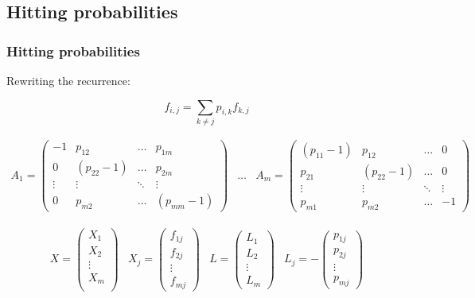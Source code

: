 \subsection{Hitting probabilities}
 \begin{frame}\frametitle{Hitting probabilities}
    \vspace{3em}
    
    Rewriting the recurrence:     
    
    \[
    f_{i,j} = \sum_{k\neq j} p_{i,k} f_{k,j}
    \]

    \fontsize{6pt}{0}\selectfont
    \begin{equation*}
    \begin{array}{rcl}
    A_1 = \left(\begin{matrix}
    -1     & p_{12}       & \ldots & p_{1m} \\
    0      & (p_{22} - 1) & \ldots & p_{2m} \\
    \vdots & \vdots       & \ddots & \vdots  \\
    0      & p_{m 2}      & \ldots & (p_{mm} - 1)
    \end{matrix}\right) & \ldots &
    A_m = \left(\begin{matrix}
    (p_{11} - 1) & p_{12}      & \ldots & 0 \\
    p_{21}       & (p_{22} -1) & \ldots & 0 \\
    \vdots        & \vdots     & \ddots & \vdots  \\
    p_{m1}       & p_{m2}      & \ldots & -1
    \end{matrix}\right)
    \end{array}
    \end{equation*}

    \begin{equation*}
    \begin{array}{rlrl}
    X = \left(\begin{array}{c}
    X_1 \\
    X_2 \\
    \vdots \\
    X_m \\
    \end{array}\right) &
    X_j = \left(\begin{array}{c}
    f_{1j} \\
    f_{2j} \\
    \vdots  \\
    f_{mj}
    \end{array}\right) &
    L = \left(\begin{array}{c}
    L_1 \\
    L_2 \\
    \vdots  \\
    L_m
    \end{array}\right) &
    L_j = - \left(\begin{array}{c}
    p_{1j} \\
    p_{2j} \\
    \vdots  \\
    p_{mj}
    \end{array}\right)
    \end{array}
    \end{equation*}
    

\end{frame}
